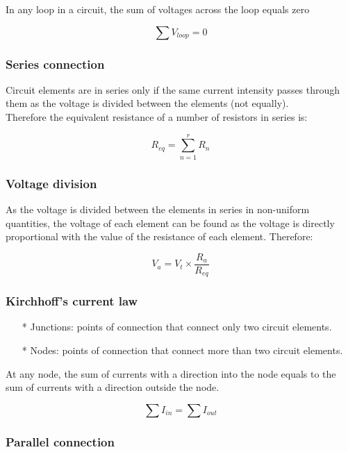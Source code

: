 \documentclass[a4paper]{book}
\begin{document}
In any loop in a circuit, the sum of voltages across the loop equals zero

\[\sum V_{loop} = 0\]

\subsubsection{Series connection}

Circuit elements are in series only if the same current intensity passes through them as the voltage is divided between the elements (not equally).\\
Therefore the equivalent resistance of a number of resistors in series is:

\[R_{eq} = \sum_{n = 1}^r R_{n}\]

\subsubsection{Voltage division}

As the voltage is divided between the elements in series in non-uniform quantities, the voltage of each element can be found as the voltage 
is directly proportional with the value of the resistance of each element. Therefore:

\[V_a = V_t \times \frac{R_a}{R_{eq}}\]

\subsubsection{Kirchhoff's current law}

\begin{itemize}


  \item[*] Junctions: points of connection that connect only two circuit elements.

  \item[*] Nodes: points of connection that connect more than two circuit elements.

\end{itemize}

\noindent At any node, the sum of currents with a direction into the node equals to the sum of
currents with a direction outside the node.

\[\sum I_{in} = \sum I_{out}\]

\subsubsection{Parallel connection}
\end{document}
